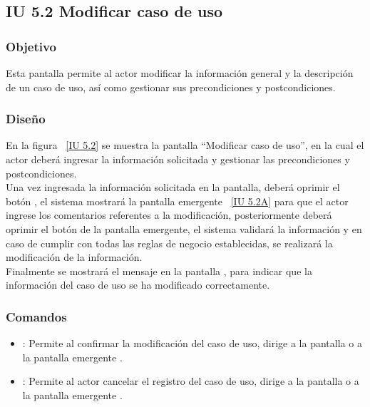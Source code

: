 \subsection{IU 5.2 Modificar caso de uso}

\subsubsection{Objetivo}
	
	Esta pantalla permite al actor modificar la información general y la descripción de un caso de uso, así como gestionar sus precondiciones y postcondiciones.

\subsubsection{Diseño}

    En la figura ~\ref{IU 5.2} se muestra la pantalla ``Modificar caso de uso'', en la cual el actor deberá ingresar la información solicitada y gestionar las precondiciones y postcondiciones.\\
    
    Una vez ingresada la información solicitada en la pantalla, deberá oprimir el botón , el sistema mostrará la pantalla emergente ~\ref{IU 5.2A} para que el actor ingrese los comentarios referentes a la modificación, posteriormente deberá oprimir el botón  de la pantalla emergente, el sistema validará la información y en caso de cumplir con todas las reglas de negocio establecidas, se realizará la modificación de la información.\\
	    
    Finalmente se mostrará el mensaje  en la pantalla , para indicar que la información del caso de uso se ha modificado correctamente.        




\subsubsection{Comandos}
\begin{itemize}
	\item {}: Permite al confirmar la modificación del caso de uso, dirige a la pantalla  o a la pantalla emergente .
	\item {}: Permite al actor cancelar el registro del caso de uso, dirige a la pantalla  o a la pantalla emergente .
\end{itemize}

